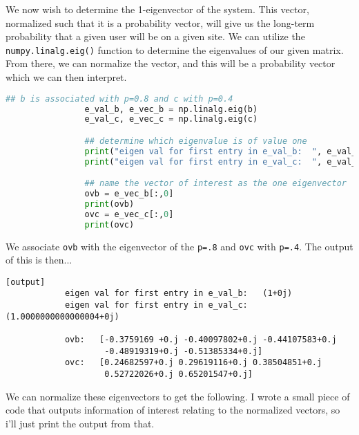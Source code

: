 \documentclass[11pt]{article}
\begin{document}
\begin{enumerate}
        We now wish to determine the 1-eigenvector of the system. This vector,
        normalized such that it is a probability vector, will give us the
        long-term probability that a given user will be on a given site. We can
        utilize the \texttt{numpy.linalg.eig()} function to determine the
        eigenvalues of our given matrix. From there, we can normalize the
        vector, and this will be a probability vector which we can then
        interpret.
        \newpage

        \begin{center}
            \begin{lstlisting}[style=mystyle, linewidth=0.94\linewidth, 
                                language=Python, gobble=9, caption=Finding
                                eigenvals and eigenvectors]
                ## b is associated with p=0.8 and c with p=0.4
                e_val_b, e_vec_b = np.linalg.eig(b)
                e_val_c, e_vec_c = np.linalg.eig(c) 

                ## determine which eigenvalue is of value one
                print("eigen val for first entry in e_val_b:  ", e_val_b[0])
                print("eigen val for first entry in e_val_c:  ", e_val_c[0], "\n")

                ## name the vector of interest as the one eigenvector
                ovb = e_vec_b[:,0]
                print(ovb)
                ovc = e_vec_c[:,0]
                print(ovc)
            \end{lstlisting}
        \end{center}
        We associate \texttt{ovb} with the eigenvector of the \texttt{p=.8} and
        \texttt{ovc} with \texttt{p=.4}. The output of this is then...
        \begin{lstlisting}[basicstyle=\ttfamily\footnotesize]
        [output]
            eigen val for first entry in e_val_b:   (1+0j)
            eigen val for first entry in e_val_c:   (1.0000000000000004+0j)

            ovb:   [-0.3759169 +0.j -0.40097802+0.j -0.44107583+0.j 
                    -0.48919319+0.j -0.51385334+0.j]
            ovc:   [0.24682597+0.j 0.29619116+0.j 0.38504851+0.j 
                    0.52722026+0.j 0.65201547+0.j]
        \end{lstlisting}
        We can normalize these eigenvectors to get the following. I wrote a
        small piece of code that outputs information of interest relating to
        the normalized vectors, so i'll just print the output from that.


\end{enumerate}
\end{document}
